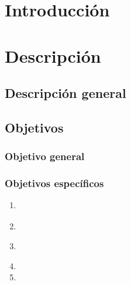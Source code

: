 \documentclass[12pt, letterpaper, table, xcdraw]{extarticle}
\begin{document}

{}
\listoffigures

\clearpage
{}
{}
\listoftables
\clearpage


\setcounter{page}{1}
{}
\section*{Introducción}

\lipsum[1-3]
\clearpage


\section{Descripción}
\subsection{Descripción general}

\lipsum[1-2]

\subsection{Objetivos}
\subsubsection{Objetivo general}

\lipsum[1-2] \parencite{knuth1984texbook}

\subsubsection{Objetivos específicos}

\lipsum[1]
\begin{enumerate}
    \item \lipsum[1][1-2] \parencite{shannon1948mathematical}
    \item \lipsum[1][1-2]
    \item \lipsum[1][1-2] \parencite{lamport1994latex}
    \item \lipsum[1][1-2]
    \item \lipsum[1][1-2]
\end{enumerate}
\clearpage
\end{document}
